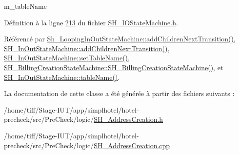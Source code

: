 m\-\_\-table\-Name 



Définition à la ligne \hyperlink{SH__IOStateMachine_8h_source_l00213}{213} du fichier \hyperlink{SH__IOStateMachine_8h_source}{S\-H\-\_\-\-I\-O\-State\-Machine.\-h}.



Référencé par \hyperlink{classSh__LoopingInOutStateMachine_acfd8d0711c793b13c759f6c50be6a315}{Sh\-\_\-\-Looping\-In\-Out\-State\-Machine\-::add\-Children\-Next\-Transition()}, \hyperlink{classSH__InOutStateMachine_a689e5513ef6ef3fc1598efacd413372e}{S\-H\-\_\-\-In\-Out\-State\-Machine\-::add\-Children\-Next\-Transition()}, \hyperlink{classSH__InOutStateMachine_a437a730d07ddd15bd96314ab0b6cf40e}{S\-H\-\_\-\-In\-Out\-State\-Machine\-::set\-Table\-Name()}, \hyperlink{classSH__BillingCreationStateMachine_ad62b77fa4aeafe200056ff3974562f83}{S\-H\-\_\-\-Billing\-Creation\-State\-Machine\-::\-S\-H\-\_\-\-Billing\-Creation\-State\-Machine()}, et \hyperlink{classSH__InOutStateMachine_a18b07a985695100612bbcbda870933b4}{S\-H\-\_\-\-In\-Out\-State\-Machine\-::table\-Name()}.



La documentation de cette classe a été générée à partir des fichiers suivants \-:\begin{DoxyCompactItemize}
\item 
/home/tiff/\-Stage-\/\-I\-U\-T/app/simplhotel/hotel-\/precheck/src/\-Pre\-Check/logic/\hyperlink{SH__AddressCreation_8h}{S\-H\-\_\-\-Address\-Creation.\-h}\item 
/home/tiff/\-Stage-\/\-I\-U\-T/app/simplhotel/hotel-\/precheck/src/\-Pre\-Check/logic/\hyperlink{SH__AddressCreation_8cpp}{S\-H\-\_\-\-Address\-Creation.\-cpp}\end{DoxyCompactItemize}
